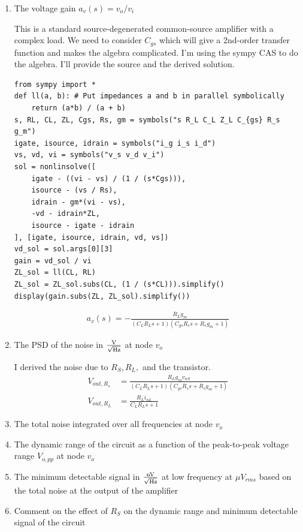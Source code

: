 \begin{enumerate}[label=(\alph*)]
  \item {\color{blue}The voltage gain $a_v(s) = v_o / v_i$}

    This is a standard source-degenerated common-source amplifier with a complex load. We need to consider $C_{gs}$ which will give a 2nd-order transfer function and makes the algebra complicated. I'm using the sympy CAS to do the algebra. I'll provide the source and the derived solution.

    \begin{verbatim}
from sympy import *
def ll(a, b): # Put impedances a and b in parallel symbolically
    return (a*b) / (a + b)
s, RL, CL, ZL, Cgs, Rs, gm = symbols("s R_L C_L Z_L C_{gs} R_s g_m")
igate, isource, idrain = symbols("i_g i_s i_d")
vs, vd, vi = symbols("v_s v_d v_i")
sol = nonlinsolve([
    igate - ((vi - vs) / (1 / (s*Cgs))),
    isource - (vs / Rs),
    idrain - gm*(vi - vs),
    -vd - idrain*ZL,
    isource - igate - idrain
], [igate, isource, idrain, vd, vs])
vd_sol = sol.args[0][3]
gain = vd_sol / vi
ZL_sol = ll(CL, RL)
ZL_sol = ZL_sol.subs(CL, (1 / (s*CL))).simplify()
display(gain.subs(ZL, ZL_sol).simplify())
    \end{verbatim}
    \begin{align*}
      a_v(s) = - \frac{R_{L} g_{m}}{\left(C_{L} R_{L} s + 1\right) \left(C_{gs} R_{s} s + R_{s} g_{m} + 1\right)}
    \end{align*}

  \item {\color{blue}The PSD of the noise in $\frac{\text{V}}{\sqrt{\text{Hz}}}$ at node $v_o$}

    I derived the noise due to $R_S, R_L, $ and the transistor.
    \begin{align*}
      V_{out, R_s} &= \frac{R_{L} g_{m} v_{nS}}{\left(C_{L} R_{L} s + 1\right) \left(C_{gs} R_{s} s + R_{s} g_{m} + 1\right)} \\
      V_{out, R_L} &= \frac{R_{L} i_{nL}}{C_{L} R_{L} s + 1}
    \end{align*}
  \item {\color{blue}The total noise integrated over all frequencies at node $v_o$}
  \item {\color{blue}The dynamic range of the circuit as a function of the peak-to-peak voltage range $V_{o,pp}$ at node $v_o$}
  \item {\color{blue}The minimum detectable signal in $\frac{\text{nV}}{\sqrt{\text{Hz}}}$ at low frequency at $\mu V_{rms}$ based on the total noise at the output of the amplifier}
  \item {\color{blue}Comment on the effect of $R_S$ on the dynamic range and minimum detectable signal of the circuit}
\end{enumerate}

